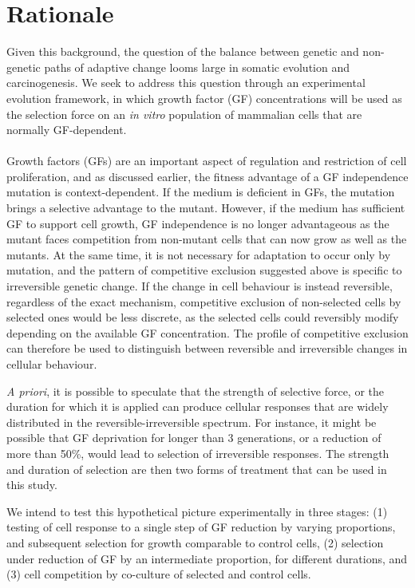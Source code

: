 \documentclass[12pt, letterpaper, onecolumn]{article}
\begin{document}
	\newpage
	\section{Rationale}

	Given this background, the question of the balance between genetic and non-genetic paths of adaptive change looms large in somatic evolution and carcinogenesis. We seek to address this question through an experimental evolution framework, in which growth factor (GF) concentrations will be used as the selection force on an \textit{in vitro} population of mammalian cells that are normally GF-dependent.
	
	\paragraph{\empty}Growth factors (GFs) are an important aspect of regulation and restriction of cell proliferation, and as discussed earlier, the fitness advantage of a GF independence mutation is context-dependent. If the medium is deficient in GFs, the mutation brings a selective advantage to the mutant. However, if the medium has sufficient GF to support cell growth, GF independence is no longer advantageous as the mutant faces competition from non-mutant cells that can now grow as well as the mutants. At the same time, it is not necessary for adaptation to occur only by mutation, and the pattern of competitive exclusion suggested above is specific to irreversible genetic change. If the change in cell behaviour is instead reversible, regardless of the exact mechanism, competitive exclusion of non-selected cells by selected ones would be less discrete, as the selected cells could reversibly modify depending on the available GF concentration. The profile of competitive exclusion can therefore be used to distinguish between reversible and irreversible changes in cellular behaviour.
	
	
	\textit{A priori}, it is possible to speculate that the strength of selective force, or the duration for which it is applied can produce cellular responses that are widely distributed in the reversible-irreversible spectrum. For instance, it might be possible that GF deprivation for longer than 3 generations, or a reduction of more than 50\%, would lead to selection of irreversible responses. The strength and duration of selection are then two forms of treatment that can be used in this study.
	
	
	We intend to test this hypothetical picture experimentally in three stages: (1) testing of cell response to a single step of GF reduction by varying proportions, and subsequent selection for growth comparable to control cells, (2) selection under reduction of GF by an intermediate proportion, for different durations, and (3) cell competition by co-culture of selected and control cells.
	
\end{document}

